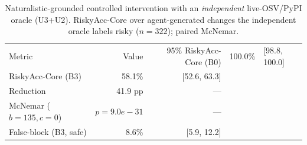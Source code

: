 \begin{table}[t]\centering
\caption{Naturalistic-grounded controlled intervention with an \emph{independent} live-OSV/PyPI oracle (U3+U2). RiskyAcc-Core over agent-generated changes the independent oracle labels risky ($n=322$); paired McNemar.}
\label{tab:e1a-indep}
\begin{tabular}{lrr}
\toprule
Metric & Value & 95\%%
\midrule
RiskyAcc-Core (B0) & 100.0\% & [98.8, 100.0] \\
RiskyAcc-Core (B3) & 58.1\% & [52.6, 63.3] \\
Reduction & 41.9 pp & --- \\
McNemar ($b{=}135,c{=}0$) & $p{=}9.0e-31$ & --- \\
False-block (B3, safe) & 8.6\% & [5.9, 12.2] \\
\bottomrule
\end{tabular}
\end{table}
